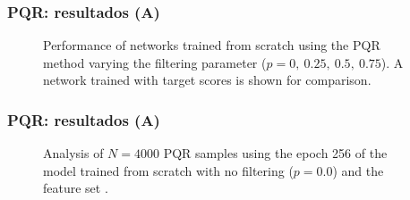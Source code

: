 \begin{frame}
\frametitle{PQR: resultados (A)}
\begin{figure}[H]
\centering
{}
\caption{Performance of networks trained from scratch using the PQR method varying the filtering parameter ($p=0,\ 0.25,\ 0.5,\ 0.75$). A network trained with target scores is shown for comparison.}
\end{figure}
\end{frame}


\begin{frame}
\frametitle{PQR: resultados (A)}
\begin{figure}[H]
\centering
{}
\caption{Analysis of $N=4000$ PQR samples using the epoch 256 of the model trained from scratch with no filtering ($p=0.0$) and the feature set .}
\end{figure}
\end{frame}

